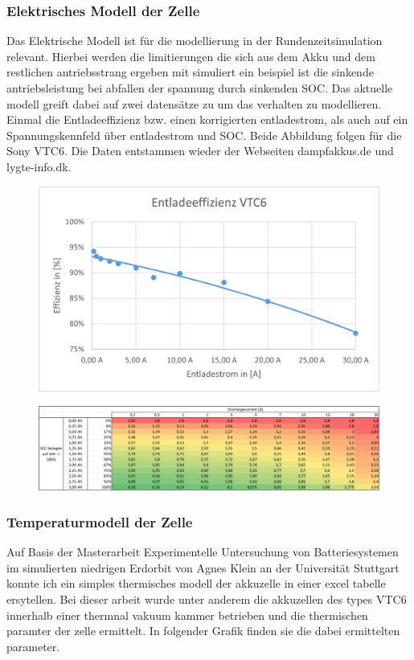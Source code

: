 \subsubsection{Elektrisches Modell der Zelle}
Das Elektrische Modell ist für die modellierung in der Rundenzeitsimulation relevant. Hierbei werden die limitierungen die sich aus dem Akku und dem restlichen antriebsstrang ergeben mit simuliert ein beispiel ist die sinkende antriebsleistung bei abfallen der spannung durch sinkenden SOC. Das aktuelle modell greift dabei auf zwei datensätze zu um das verhalten zu modellieren. Einmal die Entladeeffizienz bzw. einen korrigierten entladestrom, als auch auf ein Spannungskennfeld über entladestrom und SOC. Beide Abbildung folgen für die Sony VTC6. Die Daten entstammen wieder der Webseiten dampfakkus.de und lygte-info.dk.
\begin{figure}[h]
	\centering
	\includegraphics[width=0.7\linewidth]{bilder/Entladeeffizienz_VTC6}
	\caption{}
	\label{fig:Entladeeffizienz_VTC6}
\end{figure}
\begin{figure}[h]
	\centering
	\includegraphics[width=0.7\linewidth]{bilder/Spannung_ueber_SOC_Strom}
	\caption{}
	\label{fig:Spannung_ueber_SOC_Strom}
\end{figure}

\subsubsection{Temperaturmodell der Zelle}

Auf Basis der Masterarbeit Experimentelle Untersuchung von Batteriesystemen im simulierten niedrigen Erdorbit von Agnes Klein an der Universität Stuttgart konnte ich ein simples thermisches modell der akkuzelle in einer excel tabelle ersytellen. Bei dieser arbeit wurde unter anderem die akkuzellen des types VTC6 innerhalb einer thermnal vakuum kammer betrieben und die thermischen paramter der zelle ermittelt. In folgender Grafik finden sie die dabei ermittelten parameter.


